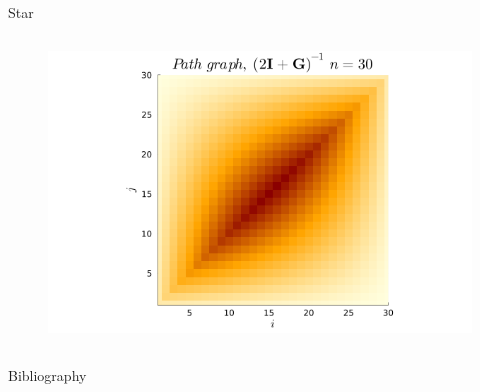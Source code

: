\documentclass{beamer}
\begin{document}
\begin{frame}[allowframebreaks]{Star}
\begin{columns}
        \begin{column}{.46\textwidth}
            \begin{figure}
                \includegraphics[width = \linewidth]{../../plots/bargmatrices/path.png}
            \end{figure}
        \end{column}
    \end{columns}


\end{frame}

\begin{frame}[allowframebreaks]{Bibliography}
    \printbibliography
\end{frame}
\end{document}
